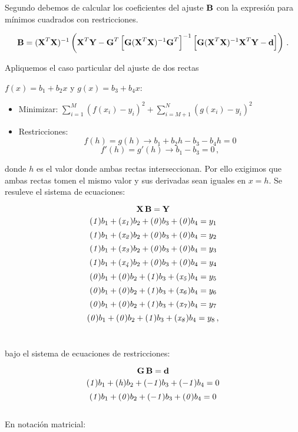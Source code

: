 \documentclass[
]{agujournal2019}
\begin{document}
Segundo debemos de calcular los coeficientes del ajuste \({\textbf B}\)
con la expresión para mínimos cuadrados con restricciones.

\[{\textbf B}=({\textbf X}^T {\textbf X})^{-1}\left( {\textbf X}^T {\textbf Y} - {\textbf G}^T\left[{\textbf G}({\textbf X}^T{\textbf X})^{-1}{\textbf G}^T \right]^{-1}
           \left[{\textbf G}({\textbf X}^T{\textbf X})^{-1}{\textbf X}^T {\textbf Y}-{\textbf d}\right] \right)\,.\]

Apliquemos el caso particular del ajuste de dos rectas

\(f(x)=b_1 + b_2 x\) y \(g(x)=b_3 + b_4 x\):\\

\begin{itemize}
\item Minimizar:  $\sum\limits^M_{i=1}(f(x_i)-y_i)^2 + \sum\limits^N_{i=M+1}(g(x_i)-y_i)^2$
\item Restricciones:
      $$f(h)=g(h)\rightarrow b_1+b_2 h - b_3 -b_4 h=0$$
      $$f'(h)=g'(h)\rightarrow b_1          - b_3           =0\,,$$
\end{itemize}

donde \(h\) es el valor donde ambas rectas interseccionan. Por ello
exigimos que ambas rectas tomen el mismo valor y sus derivadas sean
iguales en \(x=h\). Se resuleve el sistema de ecuaciones:

\[{\textbf X}\,{\textbf B}={\textbf Y}\]
\[({\it 1})b_1+({\it x_1})b_2 + ({\it 0})b_3 + ({\it 0})b_4=y_1\]
\[({\it 1})b_1+({\it x_2})b_2 + ({\it 0})b_3 + ({\it 0})b_4=y_2\]
\[({\it 1})b_1+({\it x_3})b_2 + ({\it 0})b_3 + ({\it 0})b_4=y_3\]
\[({\it 1})b_1+({\it x_4})b_2 + ({\it 0})b_3 + ({\it 0})b_4=y_4\]
\[({\it 0})b_1+({\it 0})b_2 + ({\it 1})b_3 + ({\it x_5})b_4=y_5\]
\[({\it 0})b_1+({\it 0})b_2 + ({\it 1})b_3 + ({\it x_6})b_4=y_6\]
\[({\it 0})b_1+({\it 0})b_2 + ({\it 1})b_3 + ({\it x_7})b_4=y_7\]
\[({\it 0})b_1+({\it 0})b_2 + ({\it 1})b_3 + ({\it x_8})b_4=y_8\,,\] ~

bajo el sistema de ecuaciones de restricciones:

\[{\textbf G}\,{\textbf B}={\textbf d}\]
\[({\it 1})b_1+({\it h})b_2 + (-{\it 1})b_3 + (-{\it 1})b_4=0\]
\[({\it 1})b_1+({\it 0})b_2 + (-{\it 1})b_3 + ({\it 0})b_4=0\]\\

En notación matricial:\\
\end{document}
